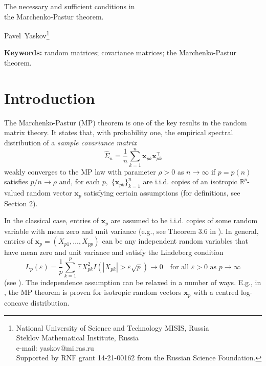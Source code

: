 \documentclass[12pt, a4paper]{article}
\newcommand\x{\mathbf x}
\newcommand\bR{{\mathbb R}}
\newcommand\wh{\widehat }
\newcommand\e{{\mathbb E}}
\begin{document}
\begin{center}
\Large The necessary and sufficient conditions in\\ the Marchenko-Pastur theorem.  
\end{center}
\begin{center}
\large Pavel~Yaskov\footnote{National University of Science and Technology MISIS, Russia
\\
Steklov Mathematical Institute, Russia\\
 e-mail: yaskov@mi.ras.ru\\Supported
    by RNF grant 14-21-00162 from the Russian Science Foundation.}
 \end{center}

\begin{abstract} We show that a weak concentration property for quadratic forms of isotropic random vectors $\x$ is necessary and sufficient for the validity of the Marchenko-Pastur theorem for sample covariance matrices  of random vectors having the form $C\x$, where $C$ is any rectangular matrix with orthonormal rows. We also obtain some general conditions  guaranteeing the weak concentration property.
\end{abstract}

\begin{center}
{\bf Keywords:} random matrices; covariance matrices; the Marchenko-Pastur theorem. %
\end{center}

\section{Introduction}
The  Marchenko-Pastur (MP) theorem  \cite{MP} is one of the key results in the random matrix theory. It states that, with probability one, the empirical spectral distribution of a {\it sample covariance matrix}  
\begin{equation}
\label{e8}
\wh \Sigma_n=\frac{1}{n}\sum_{k=1}^n \x_{pk}\x_{pk}^\top
\end{equation}
 weakly converges to the MP law   with parameter $\rho>0$  as $n\to\infty$ if  $p=p(n)$ satisfies $p/n\to \rho$ and, for each $p,$ $\{\x_{pk}\}_{k=1}^n$ are i.i.d. copies of an isotropic $\bR^p$-valued  random vector $\x_p$ satisfying certain assumptions (for definitions, see Section 2).

In the classical case, entries of $\x_p$   are assumed to be i.i.d. copies of some random variable  with mean zero and unit variance (e.g., see Theorem 3.6 in \cite{BS}). In general, entries  of $\x_p=(X_{p1},\ldots,X_{pp}) $ can be any independent random variables that have mean zero and unit variance and satisfy  the Lindeberg condition 
\begin{equation}\label{lin}
L_p(\varepsilon)=\frac{1}{p}\sum_{k=1}^p\e X_{pk}^2 I(|X_{pk}|>\varepsilon \sqrt{p})\to 0\quad\text{for all }\varepsilon>0\text{ as }p\to\infty
\end{equation}
(see \cite{P}). The independence assumption can be relaxed in a number of ways. E.g., in \cite{PP},  the MP theorem is proven for isotropic random vectors $\x_p$ with a centred log-concave distribution.   
\end{document}
